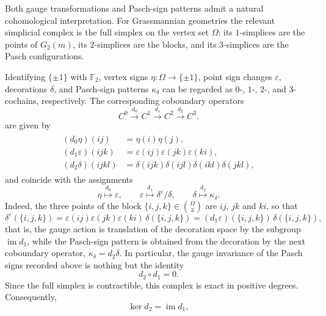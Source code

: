 \documentclass[10pt,a4paper]{amsart}
\numberwithin{equation}{section}
\begin{document}
Both gauge transformations and Pasch-sign patterns admit a natural cohomological
interpretation. For Grassmannian geometries the relevant simplicial
complex is the full simplex on the vertex set $\Omega$: its
$1$-simplices are the points of $G_2(m)$, its $2$-simplices are the
blocks, and its $3$-simplices are the Pasch configurations.

Identifying $\{\pm1\}$ with $\mathbb F_2$, vertex signs
$\eta:\Omega\to\{\pm1\}$, point sign changes $\varepsilon$,
decorations $\delta$, and Pasch-sign patterns $\kappa_\delta$
can be regarded as $0$-, $1$-, $2$-, and $3$-cochains, respectively. The corresponding
coboundary operators
\begin{equation}\label{ddef2}
C^0\stackrel{d_0}{\longrightarrow}
C^1\stackrel{d_1}{\longrightarrow}
C^2\stackrel{d_2}{\longrightarrow}
C^3 .
\end{equation}
are given by
\begin{align}\label{d0d1d2}
\begin{aligned}
(d_0\eta)(ij)
&=
\eta(i)\eta(j),\\
(d_1\varepsilon)(ijk)
&=
\varepsilon(ij)\varepsilon(jk)\varepsilon(ki),\\
(d_2\delta)(ijkl)
&=
\delta(ijk)\delta(ijl)\delta(ikl)\delta(jkl),
\end{aligned}
\end{align}
and coincide with the assignments
\begin{equation}\label{ddef1}
\eta\stackrel{d_0}{\longmapsto}\varepsilon,
\qquad
\varepsilon\stackrel{d_1}{\longmapsto}\delta^\varepsilon/\delta,
\qquad
\delta\stackrel{d_2}{\longmapsto}\kappa_\delta.
\end{equation}
Indeed, the three points of the block $\{i,j,k\}\in\binom{\Omega}{3}$ are
$ij$, $jk$ and $ki$, so that
$$
\delta^\varepsilon(\{i,j,k\})
=
\varepsilon(ij)\varepsilon(jk)\varepsilon(ki)\,
\delta(\{i,j,k\})
=
(d_1\varepsilon)(\{i,j,k\})\,\delta(\{i,j,k\}),
$$
that is, the gauge action is translation of the decoration space by the
subgroup $\operatorname{im}d_1$, while the Pasch-sign pattern is obtained
from the decoration by the next coboundary operator,
$\kappa_\delta=d_2\delta$. In particular, the gauge invariance of the
Pasch signs recorded above is nothing but the identity
\begin{equation}\label{d2d1eq}
d_2\circ d_1=0.
\end{equation}
Since the full simplex is contractible, this complex is exact in positive
degrees. Consequently,
\begin{equation}\label{rankd2}
\ker d_2=\operatorname{im}d_1,
\end{equation}
\end{document}
